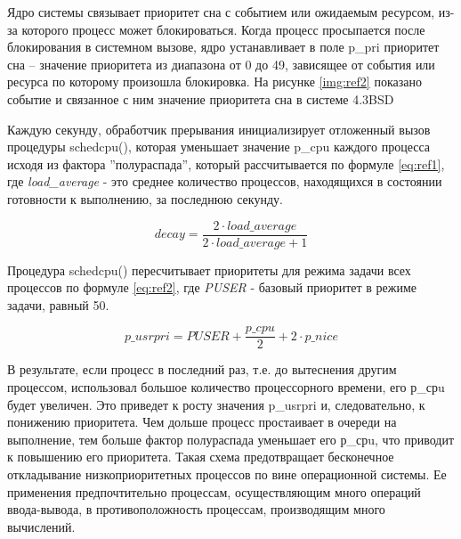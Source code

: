 \documentclass[a4paper,oneside,14pt]{extreport}
\begin{document}
Ядро системы связывает приоритет сна с событием или ожидаемым ресурсом,
из-за которого процесс может блокироваться. 
Когда процесс просыпается после блокирования в системном вызове,
ядро устанавливает в поле p\_pri приоритет сна – значение приоритета
из диапазона от 0 до 49, зависящее от события или ресурса
по которому произошла блокировка. 
На рисунке \ref{img:ref2} показано 
событие и связанное с ним значение приоритета сна 
в системе 4.3BSD 

\begin{figure}[ht!]
\end{figure}

Каждую секунду, обработчик прерывания 
инициализирует отложенный вызов процедуры
schedcpu(), которая уменьшает значение p\_cpu каждого 
процесса исходя из фактора ''полураспада'', который рассчитывается по формуле \ref{eq:ref1}, где
\textit{load\_average} - это среднее количество процессов, находящихся в состоянии готовности к выполнению, за последнюю секунду.

\begin{equation}
	\label{eq:ref1}
	decay = \frac{2 \cdot load\_average}{2 \cdot load\_average + 1}
\end{equation}

Процедура schedcpu() пересчитывает приоритеты для режима задачи
всех процессов по формуле \ref{eq:ref2}, где \textit{PUSER} - базовый приоритет в режиме задачи, равный 50.

\begin{equation}
	\label{eq:ref2}
	p\_usrpri = PUSER + \frac{p\_cpu}{2} + 2 \cdot p\_nice
\end{equation}

В результате, если процесс в последний раз, т.е. до вытеснения другим
процессом, использовал большое количество процессорного времени, его
р\_срu будет увеличен. Это приведет к росту значения p\_usrpri и,
следовательно, к понижению приоритета. 
Чем дольше процесс простаивает в очереди на выполнение,
тем больше фактор полураспада уменьшает его
р\_срu, что приводит к повышению его приоритета. Такая схема
предотвращает бесконечное откладывание низкоприоритетных процессов
по вине операционной системы.
Ее применения предпочтительно процессам, осуществляющим много
операций ввода-вывода, в противоположность процессам, производящим
много вычислений.
\end{document}
